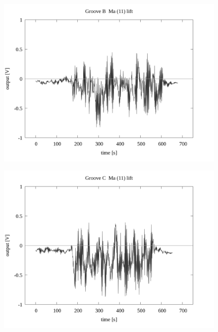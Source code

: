 \documentclass[a4paper]{jsarticle}
\begin{document}
\begin{figure}[htbp]
    \footnotesize
    \begin{center}
        \includegraphics[width=140mm]{../../../33_result/210806/moving_average/11/lift/01/Groove_B_ma(11)_lift_01.png}
    \end{center}
\end{figure}

\begin{figure}[htbp]
    \footnotesize
    \begin{center}
        \includegraphics[width=140mm]{../../../33_result/210806/moving_average/11/lift/01/Groove_C_ma(11)_lift_01.png}
    \end{center}
\end{figure}
\end{document}
